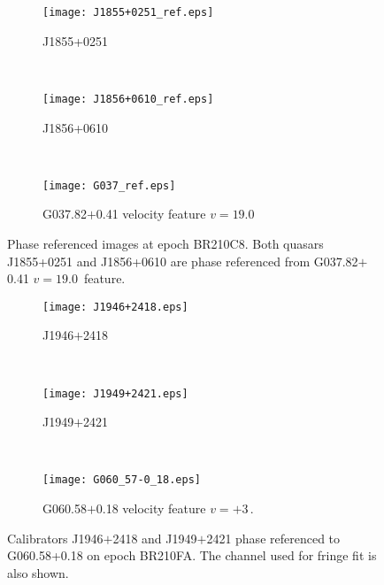        	\begin{figure}[h]
        		\begin{subfigure}[t]{0.3\textwidth}
        			\texttt{[image: J1855+0251\_ref.eps]}
        			\caption{J1855+0251}
        		\end{subfigure}
        		~
        		\begin{subfigure}[t]{0.3\textwidth}
        			\texttt{[image: J1856+0610\_ref.eps]}
        			\caption{J1856+0610}
        		\end{subfigure}
        		~
        		\begin{subfigure}[t]{0.3\textwidth}
        			\texttt{[image: G037\_ref.eps]}
        			\caption{G037.82$+$0.41 velocity feature $v=19.0$~\kms}
        		\end{subfigure}
        		\caption[G037.82$+$0.41 maps]{Phase referenced images at epoch BR210C8. Both quasars J1855+0251 and J1856+0610 are phase referenced from G037.82$+$0.41 $v=19.0$~\kms feature.}
        		\label{fig:g37_ref}
        	\end{figure}
        
        

        	\begin{figure}[h]
        		\begin{subfigure}[t]{0.3\textwidth}
        			\texttt{[image: J1946+2418.eps]}
        			\caption{J1946$+$2418}
        		\end{subfigure}
        		~
        		\begin{subfigure}[t]{0.3\textwidth}
        			\texttt{[image: J1949+2421.eps]}
        			\caption{J1949$+$2421}
        		\end{subfigure}
        		~
        		\begin{subfigure}[t]{0.3\textwidth}
        			\texttt{[image: G060\_57-0\_18.eps]}
        			\caption{G060.58$+$0.18 velocity feature $v=+3$\,\kms.}
        		\end{subfigure}
        		\caption[G060.58--0.18 maps]{Calibrators J1946$+$2418 and J1949$+$2421 phase referenced to G060.58+0.18 on epoch BR210FA. The channel used for fringe fit is also shown.}
        		\label{fig:g60_ref}
        	\end{figure}
        
        

